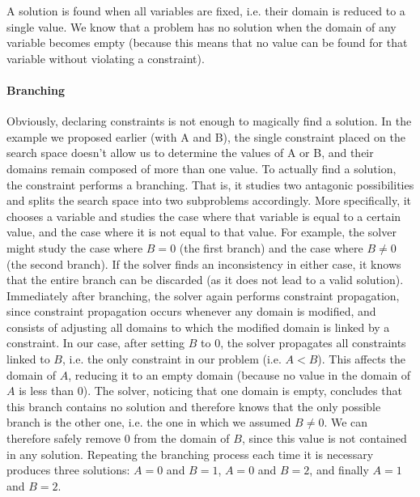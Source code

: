 A solution is found when all variables are fixed, i.e. their domain is reduced to a single value. We know that a problem has no solution when the domain of any variable becomes empty (because this means that no value can be found for that variable without violating a constraint).

\paragraph{Branching}
Obviously, declaring constraints is not enough to magically find a solution. In the example we proposed earlier (with A and B), the single constraint placed on the search space doesn't allow us to determine the values of A or B, and their domains remain composed of more than one value. 
To actually find a solution, the constraint performs a branching. That is, it studies two antagonic possibilities and splits the search space into two subproblems accordingly. More specifically, it chooses a variable and studies the case where that variable is equal to a certain value, and the case where it is not equal to that value. For example, the solver might study the case where $B=0$ (the first branch) and the case where $B \neq 0$ (the second branch). If the solver finds an inconsistency in either case, it knows that the entire branch can be discarded (as it does not lead to a valid solution). Immediately after branching, the solver again performs constraint propagation, since constraint propagation occurs whenever any domain is modified, and consists of adjusting all domains to which the modified domain is linked by a constraint. In our case, after setting $B$ to $0$, the solver propagates all constraints linked to $B$, i.e. the only constraint in our problem (i.e. $A<B$). This affects the domain of $A$, reducing it to an empty domain (because no value in the domain of $A$ is less than $0$). The solver, noticing that one domain is empty, concludes that this branch contains no solution and therefore knows that the only possible branch is the other one, i.e. the one in which we assumed $B\neq 0$. We can therefore safely remove $0$ from the domain of $B$, since this value is not contained in any solution. Repeating the branching process each time it is necessary produces three solutions: $A=0$ and $B=1$, $A=0$ and $B=2$, and finally $A=1$ and $B=2$.

